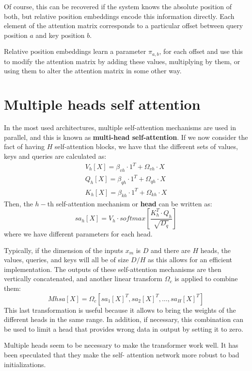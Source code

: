 Of course, this can be recovered if the system knows the absolute position of both, but relative position embeddings 
encode this information directly. Each element of the attention matrix corresponds to a particular offset between query 
position $a$ and key position $b$. 

Relative position embeddings learn a parameter $\pi_{a, b}$, for each offset and use this to modify the attention matrix 
by adding these values, multiplying by them, or using them to alter the attention matrix in some other way.
\section{Multiple heads self attention}
In the most used architectures, multiple self-attention mechanisms are used in parallel, and this is known as 
\textbf{multi-head self-attention}. If we now consider the fact of having $H$ self-attention blocks, we have that the 
different sets of values, keys and queries are calculated as: 
\begin{align*}
        V_h[X] = \beta_{vh} \cdot 1^T + \Omega_{vh} \cdot X \\ 
        Q_h[X] = \beta_{qh} \cdot 1^T + \Omega_{qh} \cdot X \\
        K_h[X] = \beta_{kh} \cdot 1^T + \Omega_{kh} \cdot X
\end{align*}
Then, the $h-$th self-attention mechanism or \textbf{head} can be written as:
\begin{equation}
    sa_h[X] = V_h \cdot softmax\left[\frac{K_h^T \cdot Q_h}{\sqrt{D_q}}\right]
\end{equation}
where we have different parameters for each head. 

Typically, if the dimension of the inputs $x_m$ is $D$ and there are $H$ heads, the values, queries, and keys will all be 
of size $D/H$ as this allows for an efficient implementation. The outputs of these self-attention mechanisms are then 
vertically concatenated, and another linear transform $\Omega_c$ is applied to combine them: 
\begin{equation}
    Mhsa[X] = \Omega_c[sa_1[X]^T, sa_2[X]^T, \dots, sa_H[X]^T]
\end{equation}
This last transformation is useful because it allows to bring the weights of the different heads in the same range. In 
addition, if necessary, this combination can be used to limit a head that provides wrong data in output by setting it to 
zero.

Multiple heads seem to be necessary to make the transformer work well. It has been speculated that they make the self-
attention network more robust to bad initializations.

